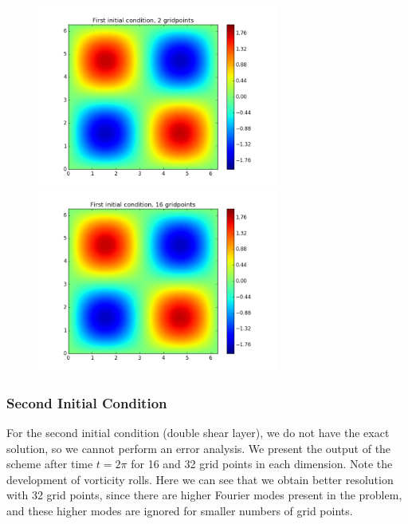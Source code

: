 \documentclass[12pt]{article}
\begin{document}
\begin{figure}[H]
\includegraphics[width=8cm]{images/colloc2.png}
\includegraphics[width=8cm]{images/colloc16.png}
\end{figure}

\subsubsection*{Second Initial Condition}

For the second initial condition (double shear layer), we do not have the exact solution, so we cannot perform an error analysis. We present the output of the scheme after time $t = 2 \pi$ for 16 and 32 grid points in each dimension. Note the development of vorticity rolls. Here we can see that we obtain better resolution with 32 grid points, since there are higher Fourier modes present in the problem, and these higher modes are ignored for smaller numbers of grid points.
\end{document}
